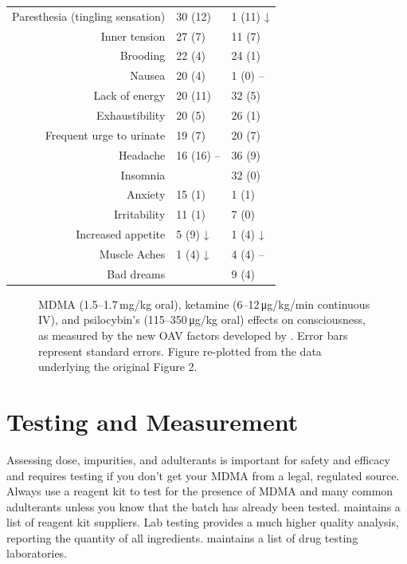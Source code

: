 \documentclass[11pt,oneside]{book}
\begin{document}
\begin{table}[htbp]
\begin{tabular}{|r|l|l|}
        Paresthesia (tingling sensation) & 30 (12) & 1 (11)\phantom{0} ↓\\
        Inner tension            & 27 (7)  & 11 (7)\\
        Brooding                 & 22 (4)  & 24 (1)\\
        Nausea                   & 20 (4)  & 1\phantom{0} (0)\phantom{0} --\\
        Lack of energy           & 20 (11) & 32 (5)\\
        Exhaustibility           & 20 (5)  & 26 (1)\\
        Frequent urge to urinate & 19 (7)  & 20 (7)\\
        Headache                 & 16 (16) -- & 36 (9)\\
        Insomnia                 &                            & 32 (0)\\
        Anxiety                  & 15 (1)  & 1\phantom{0} (1)\\
        Irritability             & 11 (1)  & 7\phantom{0} (0)\\
        Increased appetite       & 5\phantom{0} (9)\phantom{0} ↓ & 1\phantom{0} (4)\phantom{0} ↓\\
        Muscle Aches             & 1\phantom{0} (4)\phantom{0} ↓ & 4\phantom{0} (4)\phantom{0} --\\
        Bad dreams               &                                    & 9\phantom{0} (4)\\
        \hline
    \end{tabular}
\end{table}
\begin{figure}[htbp]
  \centering
  \resizebox{\textwidth}{!}{}
  \caption{MDMA (1.5--1.7\,mg/kg oral), ketamine (6--12\,μg/kg/min continuous IV), and psilocybin's (115--350\,μg/kg oral) effects on consciousness, as measured by the new OAV factors developed by \textcite{studerus2010psychometric}. Error bars represent standard errors. Figure re-plotted from the data underlying the original Figure 2.}
  \label{consciousEffects}
\end{figure}
\FloatBarrier

\section{Testing and Measurement}
\label{testing}
Assessing dose, impurities, and adulterants is important for safety and efficacy and requires testing if you don't get your MDMA from a legal, regulated source. Always use a reagent kit to test for the presence of MDMA and many common adulterants unless you know that the batch has already been tested. \textcite{testKitSuppliers} maintains a list of reagent kit suppliers. Lab testing provides a much higher quality analysis, reporting the quantity of all ingredients. \textcite{testingLabs} maintains a list of drug testing laboratories.
\end{document}
